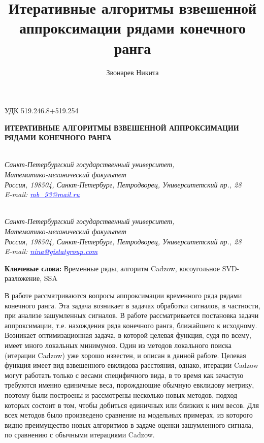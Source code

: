 \documentclass[12pt,a4paper,fleqn,leqno]{article}
\author{Звонарев Никита}
\title{Итеративные алгоритмы взвешенной аппроксимации рядами конечного ранга}
\begin{document}
\noindent УДК 519.246.8+519.254

\begin{center}{
\fontsize{18pt}{23pt}\selectfont\bf%
  \MakeUppercase{
 Итеративные алгоритмы взвешенной аппроксимации рядами конечного ранга
}}
\end{center}

\begin{center}{\bpv{}\\
\footnotesize\it Санкт-Петербургский государственный университет,\\
Математико-механический факультет
\\
\rm
Россия, 198504, Санкт-Петербург, Петродворец, Университетский пр., 28\\
E-mail: \textcolor {blue}{\underline{mb\_93@mail.ru}}}
\end{center}
\begin{center}{\\
\footnotesize\it Санкт-Петербургский государственный университет,\\
Математико-механический факультет
\\
\rm
Россия, 198504, Санкт-Петербург, Петродворец, Университетский пр., 28\\
E-mail: \textcolor {blue}{\underline{nina@gistatgroup.com}}}
\end{center}
\hspace{1.25cm}\begin{minipage}{12.16cm}\bpv\bpv\bmv \noindent
\footnotesize{\bf Ключевые слова:}\/ Временные ряды, алгоритм Cadzow, косоугольное SVD-разложение, SSA

\bpv\bpv\noindent  В работе рассматриваются вопросы аппроксимации временного ряда рядами конечного ранга. Эта задача возникает в задачах обработки сигналов, в частности, при анализе зашумленных сигналов. В работе рассматривается постановка задачи аппроксимации, т.е. нахождения ряда конечного ранга, ближайшего к исходному. Возникает оптимизационная задача, в которой целевая функция, судя по всему, имеет много локальных минимумов. Один из методов локального поиска (итерации Cadzow) уже хорошо известен, и описан в данной работе. Целевая функция имеет вид взвешенного евклидова расстояния, однако, итерации Cadzow могут работать только с весами специфичного вида, в то время как зачастую требуются именно единичные веса, порождающие обычную евклидову метрику, поэтому были построены и рассмотрены несколько новых методов, подход которых состоит в том, чтобы добиться единичных или близких к ним весов. Для всех методов было произведено сравнение на модельных примерах, из которого видно преимущество новых алгоритмов в задаче оценки зашумленного сигнала, по сравнению с обычными итерациями Cadzow.

\end{minipage}\bls\bmv
\end{document}
